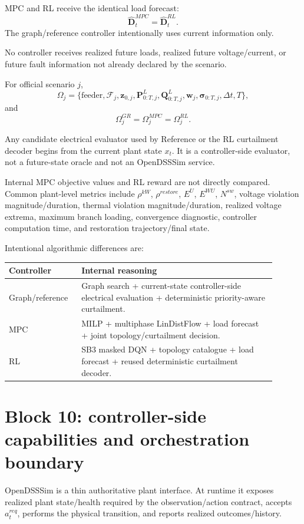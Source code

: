 \documentclass[11pt]{article}
\begin{document}
MPC and RL receive the identical load forecast:
\[
\boxed{\hat{\mathbf D}_t^{MPC}=\hat{\mathbf D}_t^{RL}.}
\]
The graph/reference controller intentionally uses current information only.

No controller receives realized future loads, realized future voltage/current, or future
fault information not already declared by the scenario.

For official scenario $j$,
\[
\Omega_j
=
\{\text{feeder},\mathcal F_j,\mathbf z_{0,j},
\mathbf P_{0:T,j}^{L},\mathbf Q_{0:T,j}^{L},
\mathbf w_j,\boldsymbol\sigma_{0:T,j},\Delta t,T\},
\]
and
\[
\boxed{\Omega_j^{GR}=\Omega_j^{MPC}=\Omega_j^{RL}.}
\]

Any candidate electrical evaluator used by Reference or the RL curtailment decoder begins
from the current plant state $x_t$. It is a controller-side evaluator, not a future-state
oracle and not an OpenDSSSim service.

Internal MPC objective values and RL reward are not directly compared. Common plant-level
metrics include $\rho^{kW}$, $\rho^{restore}$, $E^U$, $E^{WU}$, $N^{sw}$, voltage
violation magnitude/duration, thermal violation magnitude/duration, realized voltage
extrema, maximum branch loading, convergence diagnostic, controller computation time,
and restoration trajectory/final state.

Intentional algorithmic differences are:
\begin{center}
\begin{tabular}{p{0.23\linewidth}p{0.67\linewidth}}
\toprule
Controller & Internal reasoning\\
\midrule
Graph/reference & Graph search + current-state controller-side electrical evaluation +
deterministic priority-aware curtailment.\\
MPC & MILP + multiphase LinDistFlow + load forecast + joint topology/curtailment decision.\\
RL & SB3 masked DQN + topology catalogue + load forecast + reused deterministic
curtailment decoder.\\
\bottomrule
\end{tabular}
\end{center}

\section{Block 10: controller-side capabilities and orchestration boundary}
OpenDSSSim is a thin authoritative plant interface. At runtime it exposes realized plant
state/health required by the observation/action contract, accepts $a_t^{req}$, performs
the physical transition, and reports realized outcomes/history.
\end{document}

